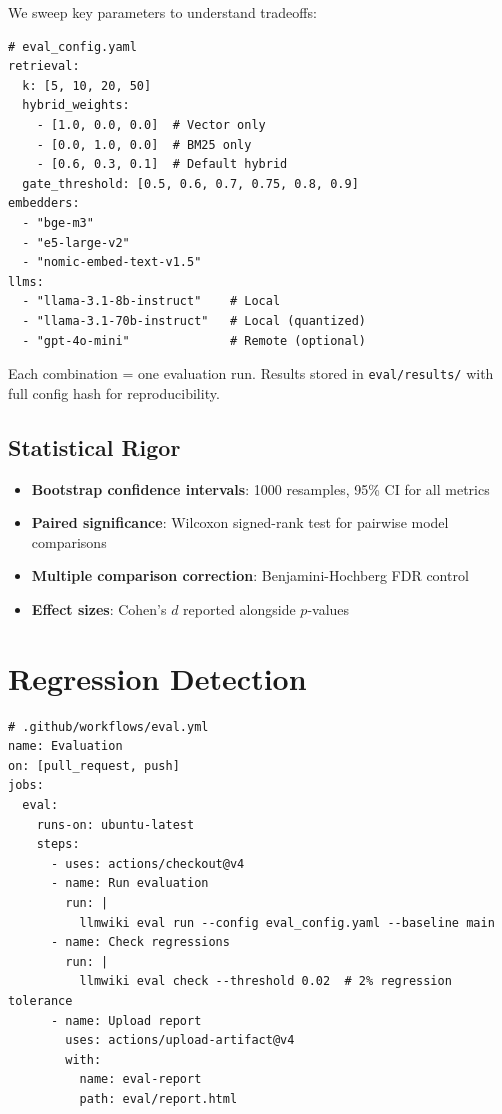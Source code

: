 We sweep key parameters to understand tradeoffs:

\begin{verbatim}
# eval_config.yaml
retrieval:
  k: [5, 10, 20, 50]
  hybrid_weights:
    - [1.0, 0.0, 0.0]  # Vector only
    - [0.0, 1.0, 0.0]  # BM25 only
    - [0.6, 0.3, 0.1]  # Default hybrid
  gate_threshold: [0.5, 0.6, 0.7, 0.75, 0.8, 0.9]
embedders:
  - "bge-m3"
  - "e5-large-v2"
  - "nomic-embed-text-v1.5"
llms:
  - "llama-3.1-8b-instruct"    # Local
  - "llama-3.1-70b-instruct"   # Local (quantized)
  - "gpt-4o-mini"              # Remote (optional)
\end{verbatim}

Each combination = one evaluation run. Results stored in \texttt{eval/results/} with full config hash for reproducibility.

\subsection{Statistical Rigor}
\label{sec:eval:statistical}

\begin{itemize}
  \item \textbf{Bootstrap confidence intervals}: 1000 resamples, 95\% CI for all metrics
  \item \textbf{Paired significance}: Wilcoxon signed-rank test for pairwise model comparisons
  \item \textbf{Multiple comparison correction}: Benjamini-Hochberg FDR control
  \item \textbf{Effect sizes}: Cohen's $d$ reported alongside $p$-values
\end{itemize}

\section{Regression Detection}
\label{sec:eval:regression}

\begin{verbatim}
# .github/workflows/eval.yml
name: Evaluation
on: [pull_request, push]
jobs:
  eval:
    runs-on: ubuntu-latest
    steps:
      - uses: actions/checkout@v4
      - name: Run evaluation
        run: |
          llmwiki eval run --config eval_config.yaml --baseline main
      - name: Check regressions
        run: |
          llmwiki eval check --threshold 0.02  # 2% regression tolerance
      - name: Upload report
        uses: actions/upload-artifact@v4
        with:
          name: eval-report
          path: eval/report.html
\end{verbatim}

